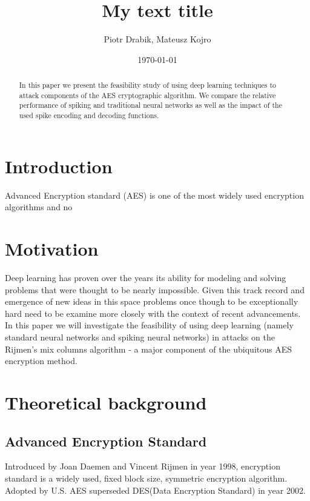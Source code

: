 \documentclass{article}
\title{My text title}
\author{Piotr Drabik, Mateusz Kojro}
\date{\today}
\begin{document}
\maketitle

\begin{abstract}
In this paper we present the feasibility study of using deep learning techniques to attack components of the AES cryptographic algorithm. We compare the relative performance of spiking and traditional neural networks as well as the impact of the used spike encoding and decoding functions.
\end{abstract}


\section{Introduction}
Advanced Encryption standard (AES) is one of the most widely used encryption algorithms and no 

\section{Motivation}

Deep learning has proven over the years its ability for modeling and solving problems that were thought to be nearly impossible. Given this track record and emergence of new ideas in this space problems once though to be exceptionally hard need to be examine more closely with the context of recent advancements. In this paper we will investigate the feasibility of using deep learning (namely standard neural networks and spiking neural networks) in attacks on the Rijmen's mix columns algorithm - a major component of the ubiquitous AES encryption method.

\section{Theoretical background}

\subsection{Advanced Encryption Standard}

Introduced by Joan Daemen and Vincent Rijmen in year 1998, encryption standard is a widely used, fixed block size, symmetric encryption algorithm. Adopted by U.S. AES superseded DES(Data Encryption Standard) in year 2002. 
\end{document}
